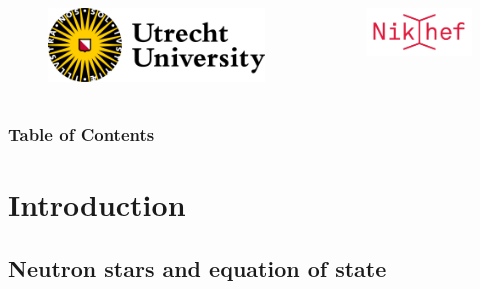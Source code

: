 \documentclass[usenames,dvipsnames,t]{beamer}
\begin{document}
{\begin{frame}
  \begin{columns}
  \begin{figure}
    \centering
    \vspace{1.5mm}
    \includegraphics[width=0.75\linewidth]{Figures/utrecht-university.png}
  \end{figure}
  \begin{figure}
    \centering
    \includegraphics[width=0.75\linewidth]{Figures/Nikhef_logo-transparent.png}
  \end{figure}
\end{columns}
  
  \end{frame}
}




\begin{frame}
\frametitle{Table of Contents}
\tableofcontents[hideallsubsections]
\end{frame}

\section{Introduction}

\subsection{Neutron stars and equation of state}
\end{document}

